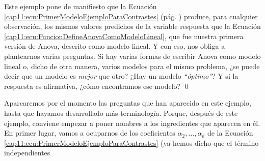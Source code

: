 \begin{ejemplo}
Este ejemplo pone de manifiesto que la Ecuación \ref{cap11:ecu:PrimerModeloEjemploParaContrastes} (pág. \pageref{cap11:ecu:PrimerModeloEjemploParaContrastes}) produce, para cualquier observación, los mismos valores predichos de la variable respuesta que la Ecuación \ref{cap11:ecu:FuncionDefineAnovaComoModeloLineal}, que fue nuestra primera versión de Anova, descrito como modelo lineal. Y con eso, nos obliga a plantearnos varias preguntas. Si hay varias formas de escribir Anova como modelo lineal o,  dicho de otra manera, varios modelos para el mismo problema, ¿se puede decir que un modelo es {\em mejor} que otro? ¿Hay un modelo {\em ``óptimo''}? Y si la respuesta es afirmativa, ¿cómo encontramos ese modelo?
%
%
%
\qed
\end{ejemplo}
Aparcaremos por el momento las preguntas que han aparecido en este ejemplo, hasta que hayamos desarrollado más terminología.  Porque, después de este ejemplo, conviene empezar a poner nombres a los ingredientes que aparecen en él. En primer lugar, vamos a ocuparnos de los coeficientes $\alpha_2,\ldots,\alpha_k$ de la Ecuación \ref{cap11:ecu:PrimerModeloEjemploParaContrastes} (ya hemos dicho que el término independientes

